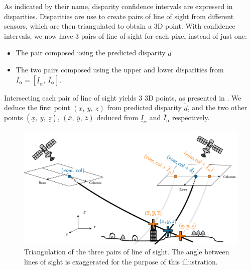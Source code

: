 As indicated by their name, disparity confidence intervals are expressed in disparities. Disparities are use to create pairs of line of sight from different sensors, which are then triangulated to obtain a 3D point. With confidence intervals, we now have 3 pairs of line of sight for each pixel instead of just one:
\begin{itemize}
    \item The pair composed using the predicted disparity $\tilde{d}$
    \item The two pairs composed using the upper and lower disparities from $I_\alpha=[\underline{I}_\alpha, ~\overline{I}_\alpha]$.
\end{itemize}
Intersecting each pair of line of sight yields $3$ 3D points, as presented in . We deduce the first point $(x, ~y, ~z)$ from predicted disparity $\tilde{d}$, and the two other points $(\underline{x}, ~\underline{y}, ~\underline{z})$, $(\overline{x}, ~\overline{y}, ~\overline{z})$ deduced from $\underline{I}_\alpha$ and $\overline{I}_\alpha$ respectively.
\begin{figure}
    \centering
    \includegraphics[width=\linewidth]{Images/Chap_6/Pairs_of_line_of_sight.png}
    \caption{Triangulation of the three pairs of line of sight. The angle between lines of sight is exaggerated for the purpose of this illustration.}
    \label{fig:pairs_of_line_of_sight}
\end{figure}

